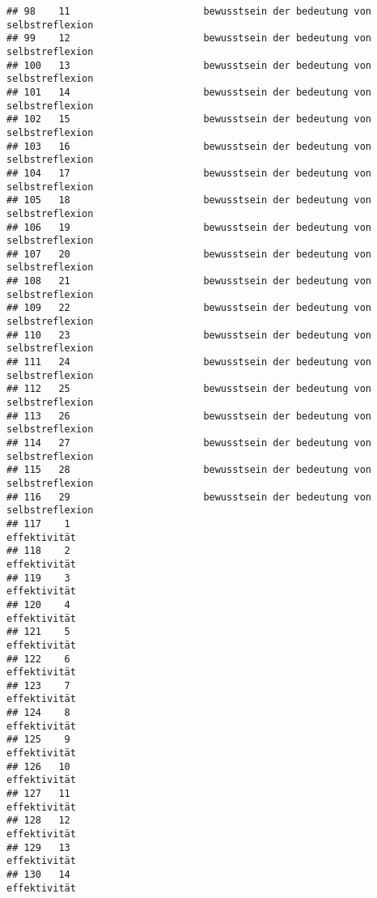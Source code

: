 \documentclass[
]{article}
\begin{document}
\begin{verbatim}
## 98    11                       bewusstsein der bedeutung von selbstreflexion
## 99    12                       bewusstsein der bedeutung von selbstreflexion
## 100   13                       bewusstsein der bedeutung von selbstreflexion
## 101   14                       bewusstsein der bedeutung von selbstreflexion
## 102   15                       bewusstsein der bedeutung von selbstreflexion
## 103   16                       bewusstsein der bedeutung von selbstreflexion
## 104   17                       bewusstsein der bedeutung von selbstreflexion
## 105   18                       bewusstsein der bedeutung von selbstreflexion
## 106   19                       bewusstsein der bedeutung von selbstreflexion
## 107   20                       bewusstsein der bedeutung von selbstreflexion
## 108   21                       bewusstsein der bedeutung von selbstreflexion
## 109   22                       bewusstsein der bedeutung von selbstreflexion
## 110   23                       bewusstsein der bedeutung von selbstreflexion
## 111   24                       bewusstsein der bedeutung von selbstreflexion
## 112   25                       bewusstsein der bedeutung von selbstreflexion
## 113   26                       bewusstsein der bedeutung von selbstreflexion
## 114   27                       bewusstsein der bedeutung von selbstreflexion
## 115   28                       bewusstsein der bedeutung von selbstreflexion
## 116   29                       bewusstsein der bedeutung von selbstreflexion
## 117    1                                                        effektivität
## 118    2                                                        effektivität
## 119    3                                                        effektivität
## 120    4                                                        effektivität
## 121    5                                                        effektivität
## 122    6                                                        effektivität
## 123    7                                                        effektivität
## 124    8                                                        effektivität
## 125    9                                                        effektivität
## 126   10                                                        effektivität
## 127   11                                                        effektivität
## 128   12                                                        effektivität
## 129   13                                                        effektivität
## 130   14                                                        effektivität

\end{verbatim}
\end{document}
